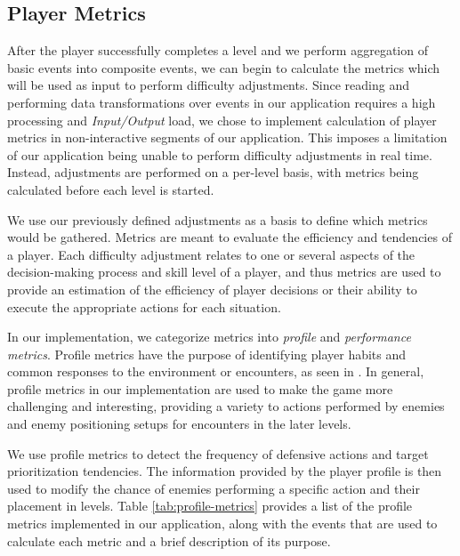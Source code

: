 

\subsection{Player Metrics}

After the player successfully completes a level and we perform aggregation of basic events into composite events, we can begin to calculate the metrics which will be used as input to perform difficulty adjustments. Since reading and performing data transformations over events in our application requires a high processing and \emph{Input/Output} load, we chose to implement calculation of player metrics in non-interactive segments of our application. This imposes a limitation of our application being unable to perform difficulty adjustments in real time. Instead, adjustments are performed on a per-level basis, with metrics being calculated before each level is started.

We use our previously defined adjustments as a basis to define which metrics would be gathered. Metrics are meant to evaluate the efficiency and tendencies of a player. Each difficulty adjustment relates to one or several aspects of the decision-making process and skill level of a player, and thus metrics are used to provide an estimation of the efficiency of player decisions or their ability to execute the appropriate actions for each situation.

In our implementation, we categorize metrics into \emph{profile} and \emph{performance metrics}. Profile metrics have the purpose of identifying player habits and common responses to the environment or encounters, as seen in \cite{ARTICLE_DynamicPlayerModelling}. In general, profile metrics in our implementation are used to make the game more challenging and interesting, providing a variety to actions performed by enemies and enemy positioning setups for encounters in the later levels.

We use profile metrics to detect the frequency of defensive actions and target prioritization tendencies. The information provided by the player profile is then used to modify the chance of enemies performing a specific action and their placement in levels.  Table \ref{tab:profile-metrics} provides a list of the profile metrics implemented in our application, along with the events that are used to calculate each metric and a brief description of its purpose.



